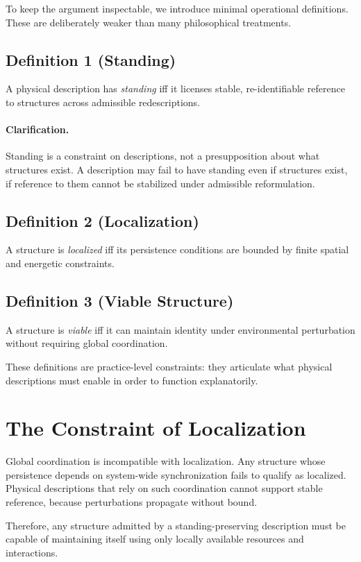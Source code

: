 \documentclass[11pt]{article}
\begin{document}
To keep the argument inspectable, we introduce minimal operational definitions. These are deliberately weaker than many philosophical treatments.

\subsection*{Definition 1 (Standing)}
A physical description has \emph{standing} iff it licenses stable, re-identifiable reference to structures across admissible redescriptions.

\paragraph{Clarification.}
Standing is a constraint on descriptions, not a presupposition about what structures exist. A description may fail to have standing even if structures exist, if reference to them cannot be stabilized under admissible reformulation.

\subsection*{Definition 2 (Localization)}
A structure is \emph{localized} iff its persistence conditions are bounded by finite spatial and energetic constraints.

\subsection*{Definition 3 (Viable Structure)}
A structure is \emph{viable} iff it can maintain identity under environmental perturbation without requiring global coordination.

These definitions are practice-level constraints: they articulate what physical descriptions must enable in order to function explanatorily.

\section{The Constraint of Localization}

Global coordination is incompatible with localization. Any structure whose persistence depends on system-wide synchronization fails to qualify as localized. Physical descriptions that rely on such coordination cannot support stable reference, because perturbations propagate without bound.

Therefore, any structure admitted by a standing-preserving description must be capable of maintaining itself using only locally available resources and interactions.
\end{document}
